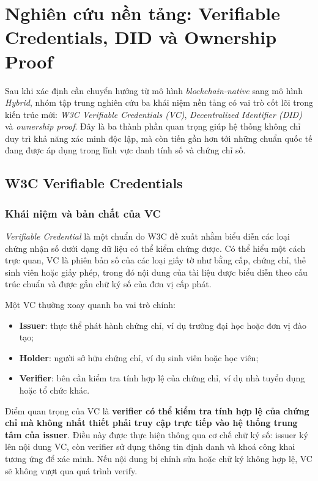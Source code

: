 \chapter{Nghiên cứu nền tảng: Verifiable Credentials, DID và Ownership Proof}

Sau khi xác định cần chuyển hướng từ mô hình \textit{blockchain-native} sang mô hình \textit{Hybrid}, nhóm tập trung nghiên cứu ba khái niệm nền tảng có vai trò cốt lõi trong kiến trúc mới: \textit{W3C Verifiable Credentials (VC)}, \textit{Decentralized Identifier (DID)} và \textit{ownership proof}. Đây là ba thành phần quan trọng giúp hệ thống không chỉ duy trì khả năng xác minh độc lập, mà còn tiến gần hơn tới những chuẩn quốc tế đang được áp dụng trong lĩnh vực danh tính số và chứng chỉ số. \cite{w3c_vc,w3c_did}

\section{W3C Verifiable Credentials}

\subsection{Khái niệm và bản chất của VC}

\textit{Verifiable Credential} là một chuẩn do W3C đề xuất nhằm biểu diễn các loại chứng nhận số dưới dạng dữ liệu có thể kiểm chứng được. Có thể hiểu một cách trực quan, VC là phiên bản số của các loại giấy tờ như bằng cấp, chứng chỉ, thẻ sinh viên hoặc giấy phép, trong đó nội dung của tài liệu được biểu diễn theo cấu trúc chuẩn và được gắn chữ ký số của đơn vị cấp phát.

Một VC thường xoay quanh ba vai trò chính:
\begin{itemize}
    \item \textbf{Issuer}: thực thể phát hành chứng chỉ, ví dụ trường đại học hoặc đơn vị đào tạo;
    \item \textbf{Holder}: người sở hữu chứng chỉ, ví dụ sinh viên hoặc học viên;
    \item \textbf{Verifier}: bên cần kiểm tra tính hợp lệ của chứng chỉ, ví dụ nhà tuyển dụng hoặc tổ chức khác.
\end{itemize}

Điểm quan trọng của VC là \textbf{verifier có thể kiểm tra tính hợp lệ của chứng chỉ mà không nhất thiết phải truy cập trực tiếp vào hệ thống trung tâm của issuer}. Điều này được thực hiện thông qua cơ chế chữ ký số: issuer ký lên nội dung VC, còn verifier sử dụng thông tin định danh và khoá công khai tương ứng để xác minh. Nếu nội dung bị chỉnh sửa hoặc chữ ký không hợp lệ, VC sẽ không vượt qua quá trình verify.

